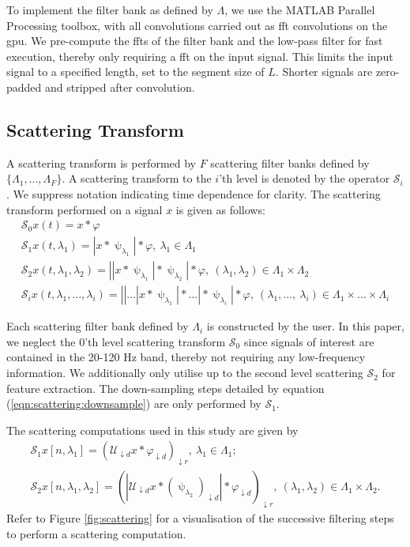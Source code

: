 {To implement the filter bank as defined by $\Lambda$, we use the MATLAB Parallel Processing toolbox, with all convolutions carried out as \ac{fft} convolutions on the \ac{gpu}. We pre-compute the \acp{fft} of the filter bank and the low-pass filter for fast execution, thereby only requiring a \ac{fft} on the input signal. This limits the input signal to a specified length, set to the segment size of $L$. Shorter signals are zero-padded and stripped after convolution.

\subsection{Scattering Transform}
A scattering transform is performed by $F$ scattering filter banks defined by $\{\Lambda_1, ..., \Lambda_F\}$. A scattering transform to the $i$'th level is denoted by the operator $\mathcal{S}_i$. We suppress notation indicating time dependence for clarity. The scattering transform performed on a signal $x$ is given as follows:
\begin{gather} 
    \mathcal{S}_0 x (t) = x * \varphi \\ 
    \mathcal{S}_1 x(t, \lambda_1) = \left|x * \uppsi_{\lambda_1}\right| * \varphi, \ \lambda_1 \in \Lambda_1 \\
    \mathcal{S}_2 x(t, \lambda_1, \lambda_2) = \left|\left|x * \uppsi_{\lambda_1}\right| * \uppsi_{\lambda_2}\right| * \varphi, \ (\lambda_1, \lambda_2) \in \Lambda_1 \times \Lambda_2 \\
    \mathcal{S}_i x(t, \lambda_1, ...,  \lambda_i) = \left|\left|...\left|x * \uppsi_{\lambda_1}\right|*...\right| * \uppsi_{\lambda_i}\right| * \varphi, \ (\lambda_1, ..., \  \lambda_i) \in \Lambda_1 \times ... \times \Lambda_i  \label{eqn:scat2}
\end{gather}

Each scattering filter bank defined by $\Lambda_i$ is constructed by the user. In this paper, we neglect the 0'th level scattering transform $\mathcal{S}_0$ since signals of interest are contained in the 20-120 Hz band, thereby not requiring any low-frequency information. We additionally only utilise up to the second level scattering $\mathcal{S}_2$ for feature extraction. The down-sampling steps detailed by equation (\ref{eqn:scattering:downsample}) are only performed by $\mathcal{S}_1$.



The scattering computations used in this study are given by
\begin{gather}
\label{eqn:scattering:s1}
    \mathcal{S}_{1}x [n, \lambda_1] =  \left(\mathcal{U}_{\downarrow d}x * \varphi_{\downarrow d}\right)_{\downarrow r}, \ \lambda_1 \in \Lambda_1; \\
    \label{eqn:scattering:s2}
    \mathcal{S}_{2}x [n, \lambda_1, \lambda_2] =  \left(\left| \mathcal{U}_{\downarrow d}x * \left(\uppsi_{\lambda_2}\right)_{\downarrow d}\right| * \varphi_{\downarrow d}\right)_{\downarrow r}, \ (\lambda_1, \lambda_2) \in \Lambda_1 \times \Lambda_2.
\end{gather}
Refer to Figure \ref{fig:scattering} for a visualisation of the successive filtering steps to perform a scattering computation.

}

